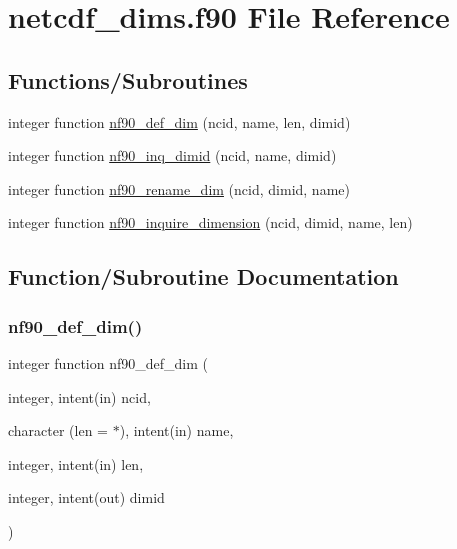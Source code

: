 \hypertarget{netcdf__dims_8f90}{}\section{netcdf\+\_\+dims.\+f90 File Reference}
\label{netcdf__dims_8f90}
\subsection*{Functions/\+Subroutines}
\begin{DoxyCompactItemize}
\item 
integer function \hyperlink{netcdf__dims_8f90_a1b815a3b57b9927b19564afaf72103e7}{nf90\+\_\+def\+\_\+dim} (ncid, name, len, dimid)
\item 
integer function \hyperlink{netcdf__dims_8f90_ae033acddda28173513d5f1144648f584}{nf90\+\_\+inq\+\_\+dimid} (ncid, name, dimid)
\item 
integer function \hyperlink{netcdf__dims_8f90_a695b95a284f7281f482646477e0f3841}{nf90\+\_\+rename\+\_\+dim} (ncid, dimid, name)
\item 
integer function \hyperlink{netcdf__dims_8f90_abc57e344659c0939a0d9c39956fd59cd}{nf90\+\_\+inquire\+\_\+dimension} (ncid, dimid, name, len)
\end{DoxyCompactItemize}


\subsection{Function/\+Subroutine Documentation}
\mbox{\label{netcdf__dims_8f90_a1b815a3b57b9927b19564afaf72103e7}} 
\subsubsection{\texorpdfstring{nf90\+\_\+def\+\_\+dim()}{nf90\_def\_dim()}}
{\footnotesize\ttfamily integer function nf90\+\_\+def\+\_\+dim (\begin{DoxyParamCaption}\item[{integer, intent(in)}]{ncid,  }\item[{character (len = $\ast$), intent(in)}]{name,  }\item[{integer, intent(in)}]{len,  }\item[{integer, intent(out)}]{dimid }\end{DoxyParamCaption})}



